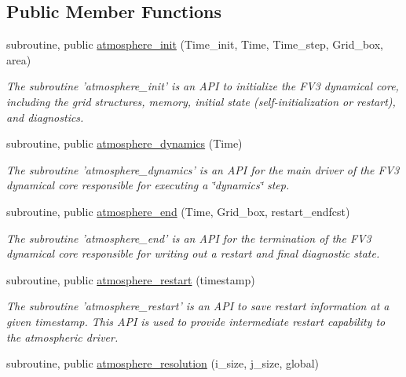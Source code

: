 \subsection*{Public Member Functions}
\begin{DoxyCompactItemize}
\item 
subroutine, public \hyperlink{classatmosphere__mod_a38757921a7432338ac2a4135dbc7d9c8}{atmosphere\-\_\-init} (Time\-\_\-init, Time, Time\-\_\-step, Grid\-\_\-box, area)
\begin{DoxyCompactList}\small\item\em The subroutine 'atmosphere\-\_\-init' is an A\-P\-I to initialize the F\-V3 dynamical core, including the grid structures, memory, initial state (self-\/initialization or restart), and diagnostics. \end{DoxyCompactList}\item 
subroutine, public \hyperlink{classatmosphere__mod_a46726a89e78937df996b8fa2987af885}{atmosphere\-\_\-dynamics} (Time)
\begin{DoxyCompactList}\small\item\em The subroutine 'atmosphere\-\_\-dynamics' is an A\-P\-I for the main driver of the F\-V3 dynamical core responsible for executing a \char`\"{}dynamics\char`\"{} step. \end{DoxyCompactList}\item 
subroutine, public \hyperlink{classatmosphere__mod_a40591968fdfea1c52562d1e18affcb98}{atmosphere\-\_\-end} (Time, Grid\-\_\-box, restart\-\_\-endfcst)
\begin{DoxyCompactList}\small\item\em The subroutine 'atmosphere\-\_\-end' is an A\-P\-I for the termination of the F\-V3 dynamical core responsible for writing out a restart and final diagnostic state. \end{DoxyCompactList}\item 
subroutine, public \hyperlink{classatmosphere__mod_a1648cbd61c86f2e8890375435b532a5d}{atmosphere\-\_\-restart} (timestamp)
\begin{DoxyCompactList}\small\item\em The subroutine 'atmosphere\-\_\-restart' is an A\-P\-I to save restart information at a given timestamp.  This A\-P\-I is used to provide intermediate restart capability to the atmospheric driver. \end{DoxyCompactList}\item 
subroutine, public \hyperlink{classatmosphere__mod_a55d141fa3702c01dae8e656e283827dc}{atmosphere\-\_\-resolution} (i\-\_\-size, j\-\_\-size, global)

\end{DoxyCompactItemize}
